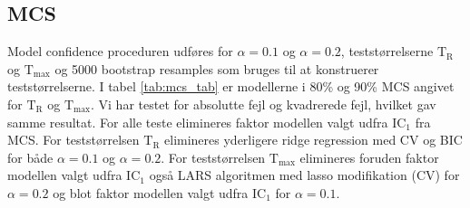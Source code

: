 \subsection{MCS} 
Model confidence proceduren udføres for \(\alpha = 0.1\) og \(\alpha = 0.2\), teststørrelserne \(\text{T}_\text{R}\) og \(\text{T}_\text{max}\) og 5000 bootstrap resamples som bruges til at konstruerer teststørrelserne.
I tabel \ref{tab:mcs_tab} er modellerne i 80\% og 90\% MCS angivet for \(\text{T}_\text{R}\) og \(\text{T}_\text{max}\).
Vi har testet for absolutte fejl og kvadrerede fejl, hvilket gav samme resultat.
For alle teste elimineres faktor modellen valgt udfra IC\(_1\) fra MCS.
For teststørrelsen \(\text{T}_\text{R}\) elimineres yderligere ridge regression med CV og BIC for både \(\alpha = 0.1\) og \(\alpha = 0.2\).
For teststørrelsen \(\text{T}_\text{max}\) elimineres foruden faktor modellen valgt udfra IC\(_1\) også LARS algoritmen med lasso modifikation (CV) for \(\alpha = 0.2\) og blot faktor modellen valgt udfra IC\(_1\) for \(\alpha = 0.1\).
%

%
